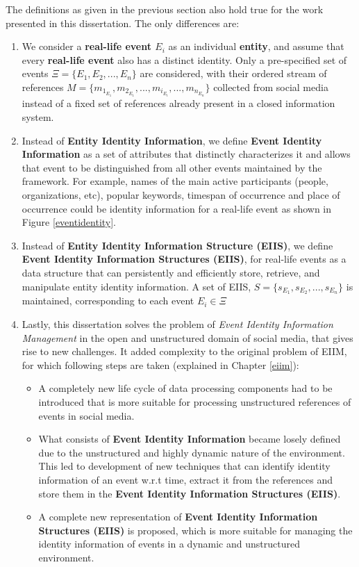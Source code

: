 The definitions as given in the previous section also hold true for the work presented in this dissertation. The only differences are:
\begin{enumerate}
\item We consider a \textbf{real-life event $E_{i}$} as an individual \textbf{entity}, and assume that every \textbf{real-life event} also has a distinct identity. Only a pre-specified set of events $\Xi = \{E_{1},E_{2}, ... ,E_{n}\}$ are considered, with their ordered stream of references $M = \{m_{1_{E_{1}}}, m_{2_{E_{1}}}, ... ,m_{i_{E_{i}}}, ... ,m_{n_{E_{n}}}\}$ collected from social media instead of a fixed set of references already present in a closed information system.

\item Instead of \textbf{Entity Identity Information}, we define \textbf{Event Identity Information} as a set of attributes that distinctly characterizes it and allows that event to be distinguished from all other events maintained by the framework. For example, names of the main active participants (people, organizations, etc), popular keywords, timespan of occurrence and place of occurrence could be identity information for a real-life event as shown in Figure \ref{eventidentity}.

\item Instead of \textbf{Entity Identity Information Structure (EIIS)}, we define \textbf{Event Identity Information Structures (EIIS)}, for real-life events as a data structure that can persistently and efficiently store, retrieve, and manipulate entity identity information. A set of EIIS, $S = \{s_{E_{1}},s_{E_{2}}, ... ,s_{E_{n}}\}$ is maintained, corresponding to each event $E_{i} \in \Xi$ 

\item Lastly, this dissertation solves the problem of \textit{Event Identity Information Management} in the open and unstructured domain of social media, that gives rise to new challenges. It added complexity to the original problem of EIIM, for which following steps are taken (explained in Chapter \ref{eiim}):

\begin{itemize}
\item A completely new life cycle of data processing components had to be introduced that is more suitable for processing unstructured references of events in social media.
\item What consists of \textbf{Event Identity Information} became losely defined due to the unstructured and highly dynamic nature of the environment. This led to development of new techniques that can identify identity information of an event w.r.t time, extract it from the references and store them in the \textbf{Event Identity Information Structures (EIIS)}.
\item A complete new representation of \textbf{Event Identity Information Structures (EIIS)} is proposed, which is more suitable for managing the identity information of events in a dynamic and unstructured environment.
\end{itemize}
\end{enumerate}



